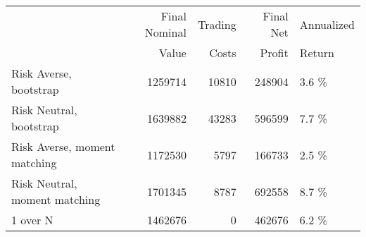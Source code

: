 \begin{tabular}{lrrrl}
\toprule
{} & Final Nominal &  Trading &  Final Net & Annualized \\
{} & Value & Costs & Profit & Return \\
\midrule
Risk Averse, bootstrap        &              1259714 &          10810 &            248904 &             3.6 \% \\
Risk Neutral, bootstrap       &              1639882 &          43283 &            596599 &             7.7 \% \\
Risk Averse, moment matching  &              1172530 &           5797 &            166733 &             2.5 \% \\
Risk Neutral, moment matching &              1701345 &           8787 &            692558 &             8.7 \% \\
1 over N                      &              1462676 &              0 &            462676 &             6.2 \% \\
\bottomrule
\end{tabular}
